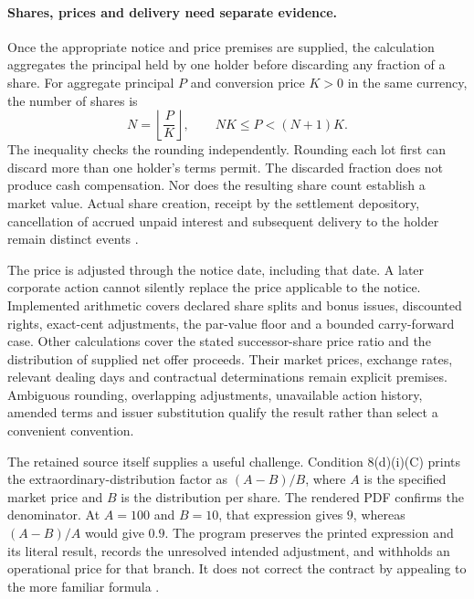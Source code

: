 \paragraph{Shares, prices and delivery need separate evidence.}
Once the appropriate notice and price premises are supplied, the calculation
aggregates the principal held by one holder before discarding any fraction
of a share. For aggregate principal $P$ and conversion price $K>0$ in the
same currency, the number of shares is
\begin{equation}
  N=\left\lfloor\frac{P}{K}\right\rfloor,
  \qquad NK\leq P<(N+1)K.
  \label{eq:ubs-whole-shares}
\end{equation}
The inequality checks the rounding independently. Rounding each lot first
can discard more than one holder's terms permit. The discarded fraction
does not produce cash compensation. Nor does the resulting share count
establish a market value. Actual share creation, receipt by the settlement
depository, cancellation of accrued unpaid interest and subsequent delivery
to the holder remain distinct events
\citep[conditions~8(a)--(c), 8(g)--(j)]{ubsat12024}.

The price is adjusted through the notice date, including that date. A later
corporate action cannot silently replace the price applicable to the notice.
Implemented arithmetic covers declared share splits and bonus issues,
discounted rights, exact-cent adjustments, the par-value floor and a bounded
carry-forward case. Other calculations cover the stated successor-share price
ratio and the distribution of supplied net offer proceeds. Their market
prices, exchange rates, relevant dealing days and contractual determinations
remain explicit premises. Ambiguous rounding, overlapping adjustments,
unavailable action history, amended terms and issuer substitution qualify
the result rather than select a convenient convention.

The retained source itself supplies a useful challenge. Condition 8(d)(i)(C)
prints the extraordinary-distribution factor as $(A-B)/B$, where $A$ is the
specified market price and $B$ is the distribution per share. The rendered
PDF confirms the denominator. At $A=100$ and $B=10$, that expression gives
$9$, whereas $(A-B)/A$ would give $0.9$. The program preserves the printed
expression and its literal result, records the unresolved intended adjustment,
and withholds an operational price for that branch. It does not correct the
contract by appealing to the more familiar formula
\citep[condition~8(d)(i)(C), PDF p.~30]{ubsat12024}.

